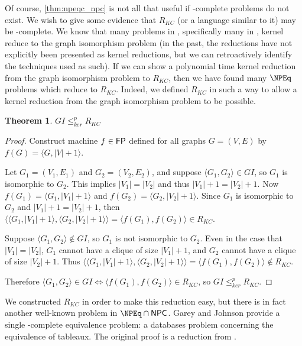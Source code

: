 \documentclass{article}
\newtheorem{theorem}{Theorem}[section]
\theoremstyle{definition} \newtheorem{definition}[definition]{Definition}
\newcommand{\kr}{\leq^{p}_{ker}} %
\newcommand{\pair}[2]{\langle#1,#2\rangle} %
\begin{document}
Of course, \autoref{thm:npeqc_npc} is not all that useful if \NPEq-complete
problems do not exist. We wish to give some evidence that $R_{KC}$ (or a
language similar to it) may be \NPEq-complete. We know that many problems in
\NP, specifically many in \NPEq, kernel reduce to the graph isomorphism problem
(in the past, the reductions have not explicitly been presented as kernel
reductions, but we can retroactively identify the techniques used as such). If
we can show a polynomial time kernel reduction from the graph isomorphism
problem to $R_{KC}$, then we have found many $\NPEq$ problems which reduce to
$R_{KC}$. Indeed, we defined $R_{KC}$ in such a way to allow a kernel reduction
from the graph isomorphism problem to be possible.

\begin{theorem}$GI\kr R_{KC}$\end{theorem}
\begin{proof}
  Construct machine $f\in{\ensuremath{\mathsf{FP}}}$ defined for all graphs $G=(V,E)$ by
  $f(G)=\pair{G}{|V|+1}$.

  Let $G_1=(V_1, E_1)$ and $G_2=(V_2, E_2)$, and suppose $\pair{G_1}{G_2}\in
  GI$, so $G_1$ is isomorphic to $G_2$. This implies $|V_1|=|V_2|$ and thus
  $|V_1|+1=|V_2|+1$. Now $f(G_1)=\pair{G_1}{|V_1|+1}$ and $f(G_2)=\pair{G_2}{
  |V_2|+1}$. Since $G_1$ is isomorphic to $G_2$ and $|V_1|+1=|V_2|+1$, then
  $\pair{\pair{G_1}{|V_1|+1}}{\pair{G_2}{|V_2|+1}}=\pair{f(G_1)}{f(G_2)}\in
  R_{KC}$.
  
  Suppose $\pair{G_1}{G_2}\notin GI$, so $G_1$ is not isomorphic to $G_2$. Even
  in the case that $|V_1|=|V_2|$, $G_1$ cannot have a clique of size $|V_1|+1$,
  and $G_2$ cannot have a clique of size $|V_2|+1$. Thus
  $\pair{\pair{G_1}{|V_1|+1}}{\pair{G_2}{|V_2|+1}}=\pair{f(G_1)}{f(G_2)}\notin
  R_{KC}$.

  Therefore $\pair{G_1}{G_2}\in GI\iff \pair{f(G_1)}{f(G_2)}\in R_{KC}$, so
  $GI\kr R_{KC}$.
\end{proof}

We constructed $R_{KC}$ in order to make this reduction easy, but there is in
fact another well-known problem in $\NPEq\cap\NPC$. Garey and Johnson provide a
single \NP-complete equivalence problem: a databases problem concerning the
equivalence of tableaux.\cite{gj79} The original proof is a reduction from
\TSAT.\cite{asu79}
\end{document}
